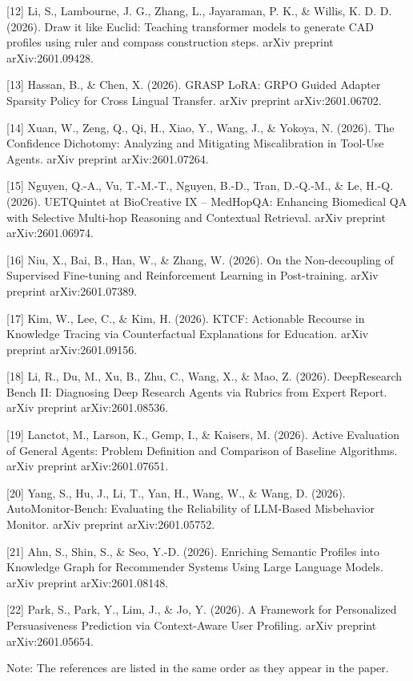 [12] Li, S., Lambourne, J. G., Zhang, L., Jayaraman, P. K., & Willis, K. D. D. (2026). Draw it like Euclid: Teaching transformer models to generate CAD profiles using ruler and compass construction steps. arXiv preprint arXiv:2601.09428.

[13] Hassan, B., & Chen, X. (2026). GRASP LoRA: GRPO Guided Adapter Sparsity Policy for Cross Lingual Transfer. arXiv preprint arXiv:2601.06702.

[14] Xuan, W., Zeng, Q., Qi, H., Xiao, Y., Wang, J., & Yokoya, N. (2026). The Confidence Dichotomy: Analyzing and Mitigating Miscalibration in Tool-Use Agents. arXiv preprint arXiv:2601.07264.

[15] Nguyen, Q.-A., Vu, T.-M.-T., Nguyen, B.-D., Tran, D.-Q.-M., & Le, H.-Q. (2026). UETQuintet at BioCreative IX -- MedHopQA: Enhancing Biomedical QA with Selective Multi-hop Reasoning and Contextual Retrieval. arXiv preprint arXiv:2601.06974.

[16] Niu, X., Bai, B., Han, W., & Zhang, W. (2026). On the Non-decoupling of Supervised Fine-tuning and Reinforcement Learning in Post-training. arXiv preprint arXiv:2601.07389.

[17] Kim, W., Lee, C., & Kim, H. (2026). KTCF: Actionable Recourse in Knowledge Tracing via Counterfactual Explanations for Education. arXiv preprint arXiv:2601.09156.

[18] Li, R., Du, M., Xu, B., Zhu, C., Wang, X., & Mao, Z. (2026). DeepResearch Bench II: Diagnosing Deep Research Agents via Rubrics from Expert Report. arXiv preprint arXiv:2601.08536.

[19] Lanctot, M., Larson, K., Gemp, I., & Kaisers, M. (2026). Active Evaluation of General Agents: Problem Definition and Comparison of Baseline Algorithms. arXiv preprint arXiv:2601.07651.

[20] Yang, S., Hu, J., Li, T., Yan, H., Wang, W., & Wang, D. (2026). AutoMonitor-Bench: Evaluating the Reliability of LLM-Based Misbehavior Monitor. arXiv preprint arXiv:2601.05752.

[21] Ahn, S., Shin, S., & Seo, Y.-D. (2026). Enriching Semantic Profiles into Knowledge Graph for Recommender Systems Using Large Language Models. arXiv preprint arXiv:2601.08148.

[22] Park, S., Park, Y., Lim, J., & Jo, Y. (2026). A Framework for Personalized Persuasiveness Prediction via Context-Aware User Profiling. arXiv preprint arXiv:2601.05654. 

Note: The references are listed in the same order as they appear in the paper. 


